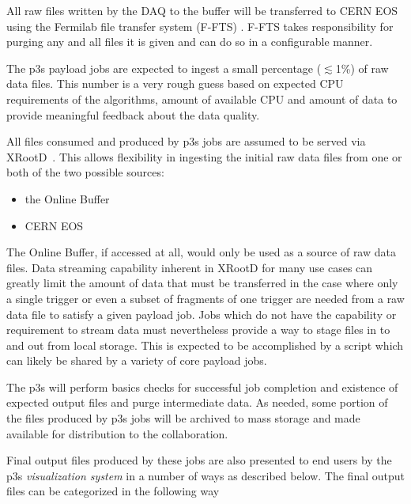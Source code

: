 \documentclass[pdftex,12pt,letter]{article}
\begin{document}
All raw files written by the DAQ to the buffer will be transferred to
CERN EOS using the Fermilab file transfer system (F-FTS)
\cite{docdb1212,fts}.  F-FTS takes responsibility for purging any and
all files it is given and can do so in a configurable manner.

The p3s payload jobs are expected to ingest a small percentage
($\lesssim$1\%) of raw data files.  This number is a very rough guess
based on expected CPU requirements of the algorithms, amount of
available CPU and amount of data to provide meaningful feedback about
the data quality.

All files consumed and produced by p3s jobs are assumed to be served
via XRootD~\cite{xrootd}.  This allows flexibility in ingesting the
initial raw data files from one or both of the two possible sources:
\begin{itemize}
\item the Online Buffer
\item CERN EOS~\cite{eos}
\end{itemize}
The Online Buffer, if accessed at all, would only be used as a source
of raw data files.  
Data streaming capability inherent in XRootD for many use cases
can greatly limit the amount of data that must be
transferred in the case where only a single trigger or even a subset
of fragments of one trigger are needed from a raw data file to satisfy
a given payload job.  Jobs which do not have the capability or
requirement to stream data must nevertheless provide a way to stage files
in to and out from local storage.  This is expected to be accomplished
by a script which can likely be shared by a variety of core payload
jobs.

The p3s will perform basics checks for successful job completion
and existence of expected output files and purge intermediate data.
As needed, some portion of the files produced by p3s jobs will be
archived to mass storage and made available for distribution to the
collaboration.

Final output files produced by these jobs are also presented to end
users by the p3s \textit{visualization system} in a number of ways as
described below.  The final output files can be categorized in the
following way
\end{document}
